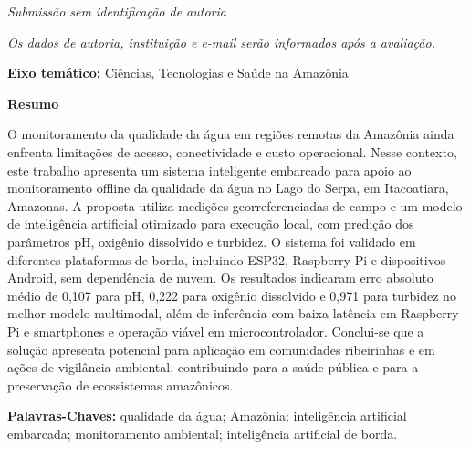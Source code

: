 \documentclass[
  12pt,
  openright,
  oneside,
  a4paper,
  brazilian
]{abntex2}
\begin{document}
\begin{center}
{\bfseries\MakeUppercase{\thetitle}}
\end{center}

\begin{center}
\textit{Submiss\~ao sem identifica\c{c}\~ao de autoria}
\end{center}

\begin{center}
\textit{Os dados de autoria, institui\c{c}\~ao e e-mail ser\~ao informados ap\'os a avalia\c{c}\~ao.}
\end{center}

\begin{center}
\textbf{Eixo tem\'atico:} Ci\^encias, Tecnologias e Sa\'ude na Amaz\^onia
\end{center}

\noindent\textbf{Resumo}

\vspace{0.3cm}
\noindent
O monitoramento da qualidade da \'agua em regi\~oes remotas da Amaz\^onia ainda enfrenta limita\c{c}\~oes de acesso, conectividade e custo operacional. Nesse contexto, este trabalho apresenta um sistema inteligente embarcado para apoio ao monitoramento offline da qualidade da \'agua no Lago do Serpa, em Itacoatiara, Amazonas. A proposta utiliza medi\c{c}\~oes georreferenciadas de campo e um modelo de intelig\^encia artificial otimizado para execu\c{c}\~ao local, com predi\c{c}\~ao dos par\^ametros pH, oxig\^enio dissolvido e turbidez. O sistema foi validado em diferentes plataformas de borda, incluindo ESP32, Raspberry Pi e dispositivos Android, sem depend\^encia de nuvem. Os resultados indicaram erro absoluto m\'edio de 0,107 para pH, 0,222 para oxig\^enio dissolvido e 0,971 para turbidez no melhor modelo multimodal, al\'em de infer\^encia com baixa lat\^encia em Raspberry Pi e smartphones e opera\c{c}\~ao vi\'avel em microcontrolador. Conclui-se que a solu\c{c}\~ao apresenta potencial para aplica\c{c}\~ao em comunidades ribeirinhas e em a\c{c}\~oes de vigil\^ancia ambiental, contribuindo para a sa\'ude p\'ublica e para a preserva\c{c}\~ao de ecossistemas amaz\^onicos.

\vspace{0.5cm}
\noindent\textbf{Palavras-Chaves:} qualidade da \'agua; Amaz\^onia; intelig\^encia artificial embarcada; monitoramento ambiental; intelig\^encia artificial de borda.

\vspace{0.8cm}







\postextual

\end{document}
